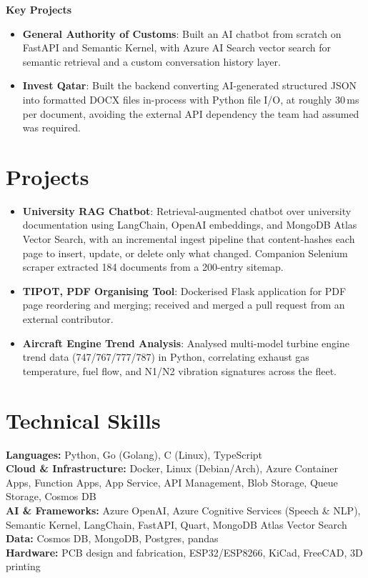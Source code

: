 \documentclass[10pt,a4paper]{article}
\begin{document}
\vspace{2pt}
\textbf{Key Projects}
\begin{itemize}
    \item \textbf{General Authority of Customs}: Built an AI chatbot from scratch
    on FastAPI and Semantic Kernel, with Azure AI Search vector search for
    semantic retrieval and a custom conversation history layer.
    \item \textbf{Invest Qatar}: Built the backend converting AI-generated
    structured JSON into formatted DOCX files in-process with Python file I/O, at
    roughly 30\,ms per document, avoiding the external API dependency the team had
    assumed was required.
\end{itemize}

\section*{Projects}
\begin{itemize}
    \item \textbf{University RAG Chatbot}: Retrieval-augmented chatbot over
    university documentation using LangChain, OpenAI embeddings, and MongoDB Atlas
    Vector Search, with an incremental ingest pipeline that content-hashes each
    page to insert, update, or delete only what changed. Companion Selenium
    scraper extracted 184 documents from a 200-entry sitemap.
    \item \textbf{TIPOT, PDF Organising Tool}: Dockerised Flask application for
    PDF page reordering and merging; received and merged a pull request from an
    external contributor.
    \item \textbf{Aircraft Engine Trend Analysis}: Analysed multi-model turbine
    engine trend data (747/767/777/787) in Python, correlating exhaust gas
    temperature, fuel flow, and N1/N2 vibration signatures across the fleet.
\end{itemize}

\section*{Technical Skills}
\textbf{Languages:} Python, Go (Golang), C (Linux), TypeScript\\
\textbf{Cloud \& Infrastructure:} Docker, Linux (Debian/Arch), Azure Container Apps, Function Apps, App Service, API Management, Blob Storage, Queue Storage, Cosmos DB\\
\textbf{AI \& Frameworks:} Azure OpenAI, Azure Cognitive Services (Speech \& NLP), Semantic Kernel, LangChain, FastAPI, Quart, MongoDB Atlas Vector Search\\
\textbf{Data:} Cosmos DB, MongoDB, Postgres, pandas\\
\textbf{Hardware:} PCB design and fabrication, ESP32/ESP8266, KiCad, FreeCAD, 3D printing
\end{document}
